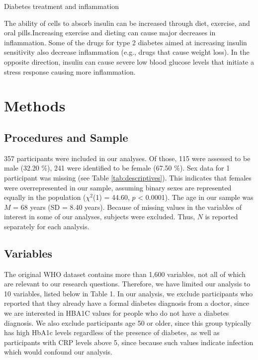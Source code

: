 \documentclass[
  man]{apa6}
\begin{document}
Diabetes treatment and inflammation

The ability of cells to absorb insulin can be increased through diet, exercise, and oral pills.Increasing exercise and dieting can cause major decreases in inflammation. Some of the drugs for type 2 diabetes aimed at increasing insulin sensitivity also decrease inflammation (e.g., drugs that cause weight loss). In the opposite direction, insulin can cause severe low blood glucose levels that initiate a stress response causing more inflammation.

\hypertarget{methods}{%
\section{Methods}\label{methods}}

\hypertarget{procedures-and-sample}{%
\subsection{Procedures and Sample}\label{procedures-and-sample}}

357 participants were included in our analyses. Of those, 115 were assessed to be male (32.20 \%), 241 were identified to be female (67.50 \%). Sex data for 1 participant was missing (see Table \ref{tab:descriptives}). This indicates that females were overrepresented in our sample, assuming binary sexes are represented equally in the population (\(\chi^2\)(1) = 44.60, \(p\) \textless{} 0.0001). The age in our sample was \(M\) = 68 years (SD = 8.40 years).
Because of missing values in the variables of interest in some of our analyses, subjects were excluded. Thus, \(N\) is reported separately for each analysis.

\hypertarget{variables}{%
\subsection{Variables}\label{variables}}

The original WHO dataset contains more than 1,600 variables, not all of which are relevant to our research questions. Therefore, we have limited our analysis to 10 variables, listed below in Table 1. In our analysis, we exclude participants who reported that they already have a formal diabetes diagnosis from a doctor, since we are interested in HBA1C values for people who do not have a diabetes diagnosis. We also exclude participants age 50 or older, since this group typically has high HbA1c levels regardless of the presence of diabetes, as well as participants with CRP levels above 5, since because such values indicate infection which would confound our analysis.
\end{document}
